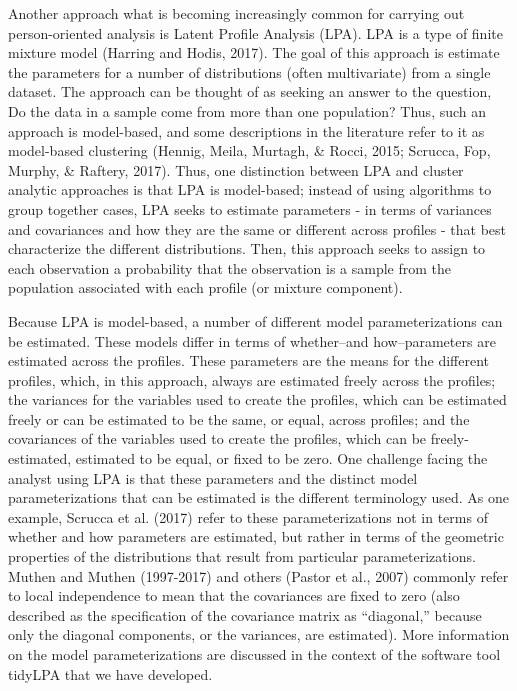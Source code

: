 \documentclass[man]{apa6}
\begin{document}
Another approach what is becoming increasingly common for carrying out
person-oriented analysis is Latent Profile Analysis (LPA). LPA is a type
of finite mixture model (Harring and Hodis, 2017). The goal of this
approach is estimate the parameters for a number of distributions (often
multivariate) from a single dataset. The approach can be thought of as
seeking an answer to the question, Do the data in a sample come from
more than one population? Thus, such an approach is model-based, and
some descriptions in the literature refer to it as model-based
clustering (Hennig, Meila, Murtagh, \& Rocci, 2015; Scrucca, Fop,
Murphy, \& Raftery, 2017). Thus, one distinction between LPA and cluster
analytic approaches is that LPA is model-based; instead of using
algorithms to group together cases, LPA seeks to estimate parameters -
in terms of variances and covariances and how they are the same or
different across profiles - that best characterize the different
distributions. Then, this approach seeks to assign to each observation a
probability that the observation is a sample from the population
associated with each profile (or mixture component).

Because LPA is model-based, a number of different model
parameterizations can be estimated. These models differ in terms of
whether--and how--parameters are estimated across the profiles. These
parameters are the means for the different profiles, which, in this
approach, always are estimated freely across the profiles; the variances
for the variables used to create the profiles, which can be estimated
freely or can be estimated to be the same, or equal, across profiles;
and the covariances of the variables used to create the profiles, which
can be freely-estimated, estimated to be equal, or fixed to be zero. One
challenge facing the analyst using LPA is that these parameters and the
distinct model parameterizations that can be estimated is the different
terminology used. As one example, Scrucca et al. (2017) refer to these
parameterizations not in terms of whether and how parameters are
estimated, but rather in terms of the geometric properties of the
distributions that result from particular parameterizations. Muthen and
Muthen (1997-2017) and others (Pastor et al., 2007) commonly refer to
local independence to mean that the covariances are fixed to zero (also
described as the specification of the covariance matrix as
\enquote{diagonal,} because only the diagonal components, or the
variances, are estimated). More information on the model
parameterizations are discussed in the context of the software tool
tidyLPA that we have developed.
\end{document}
